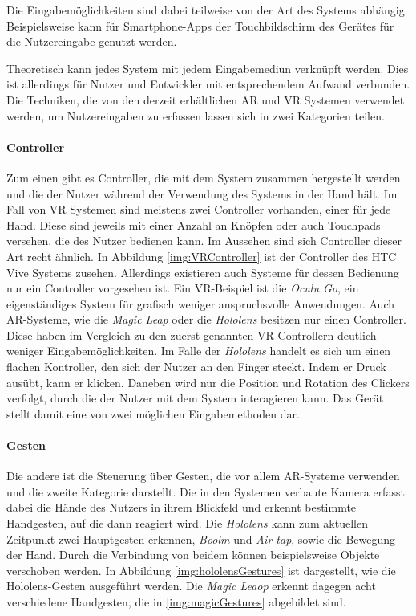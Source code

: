 Die Eingabemöglichkeiten sind dabei teilweise von der Art des Systems abhängig. 
Beispielsweise kann für Smartphone-Apps der Touchbildschirm des Gerätes für die Nutzereingabe genutzt werden. 

Theoretisch kann jedes System mit jedem Eingabemediun verknüpft werden. Dies ist allerdings für Nutzer und Entwickler mit entsprechendem Aufwand verbunden. Die Techniken, die von den derzeit erhältlichen AR und VR Systemen verwendet werden, um Nutzereingaben zu erfassen lassen sich in zwei Kategorien teilen. 
\paragraph{Controller}
Zum einen gibt es Controller, die mit dem System zusammen hergestellt werden und die der Nutzer während der Verwendung des Systems in der Hand hält. Im Fall von VR Systemen sind meistens zwei Controller vorhanden, einer für jede Hand. Diese sind jeweils mit einer Anzahl an Knöpfen oder auch Touchpads versehen, die des Nutzer bedienen kann. Im Aussehen sind sich Controller dieser Art recht ähnlich. In Abbildung \ref{img:VRController} ist der Controller des HTC Vive Systems zusehen.
Allerdings existieren auch Systeme für dessen Bedienung nur ein Controller vorgesehen ist. Ein VR-Beispiel ist die \textit{Oculu Go}, ein eigenständiges System für grafisch weniger anspruchsvolle Anwendungen. 
Auch AR-Systeme, wie die \textit{Magic Leap} oder die \textit{Hololens} besitzen nur einen Controller. Diese haben im Vergleich zu den zuerst genannten VR-Controllern deutlich weniger Eingabemöglichkeiten. Im Falle der \textit{Hololens} handelt es sich um einen flachen Kontroller, den sich der Nutzer an den Finger steckt. Indem er Druck ausübt, kann er klicken. Daneben wird nur die Position und Rotation des Clickers verfolgt, durch die der Nutzer mit dem System interagieren kann. Das Gerät stellt damit eine von zwei möglichen Eingabemethoden dar. 

\paragraph{Gesten}
Die andere ist die Steuerung über Gesten, die vor allem AR-Systeme verwenden und die zweite Kategorie darstellt.
Die in den Systemen verbaute Kamera erfasst dabei die Hände des Nutzers in ihrem Blickfeld und erkennt bestimmte Handgesten, auf die dann reagiert wird. 
Die \textit{Hololens} kann zum aktuellen Zeitpunkt zwei Hauptgesten erkennen, \textit{Boolm} und \textit{Air tap}, sowie die Bewegung der Hand. Durch die Verbindung von beidem können beispielsweise Objekte verschoben werden. In Abbildung \ref{img:hololensGestures} ist dargestellt, wie die Hololens-Gesten ausgeführt werden. 
Die \textit{Magic Leaop} erkennt dagegen acht verschiedene Handgesten, die in \ref{img:magicGestures} abgebildet sind. 



